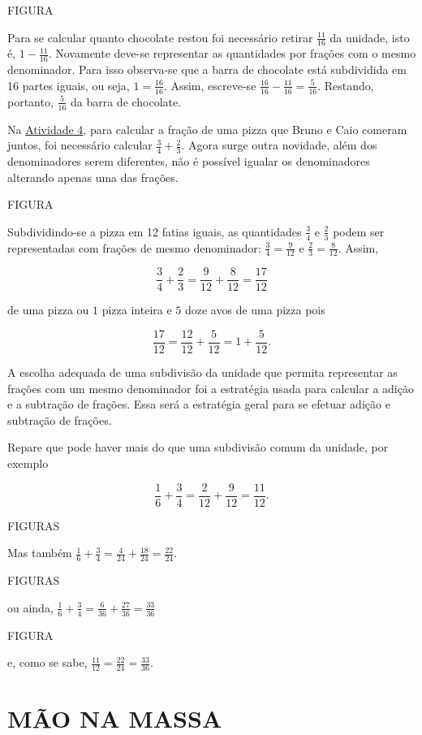FIGURA

Para se calcular quanto chocolate restou foi necessário retirar $\frac{11}{16}$ da unidade, isto é, $1 - \frac{11}{16}$. 
Novamente deve-se representar as quantidades por frações com o mesmo denominador. 
Para isso observa-se que a barra de chocolate está subdividida em 16 partes iguais, ou seja,  $1 = \frac{16}{16}$. Assim, escreve-se $\frac{16}{16} - \frac{11}{16} = \frac{5}{16}$. 
Restando, portanto, $\frac{5}{16}$ da barra de chocolate.

Na \hyperref[chap5-ativ4]{Atividade 4}, para calcular a fração de uma pizza que Bruno e Caio comeram juntos, foi necessário calcular $\frac{3}{4} + \frac{2}{3}$. 
Agora surge outra novidade, além dos denominadores serem diferentes, não é possível igualar os denominadores alterando apenas uma das frações.

FIGURA

Subdividindo-se  a pizza em 12 fatias iguais, as quantidades $\frac{3}{4}$ e $\frac{2}{3}$ podem ser representadas com frações de mesmo denominador: $\frac{3}{4} = \frac{9}{12}$ e $\frac{2}{3} = \frac{8}{12}$. Assim,

\[ \frac{3}{4} + \frac{2}{3} = \frac{9}{12} + \frac{8}{12} = \frac{17}{12}\]

de uma pizza ou $1$ pizza inteira e $5$ doze avos de uma pizza pois 

\[\frac{17}{12} = \frac{12}{12} + \frac{5}{12} = 1 + \frac{5}{12}.\]

A escolha adequada de uma subdivisão da unidade que permita representar as frações com um mesmo denominador foi a estratégia usada para calcular a adição e a subtração de frações. 
Essa será a estratégia geral para se efetuar adição e subtração de frações.

Repare que pode haver mais do que uma subdivisão comum da unidade, por exemplo

\[ \frac{1}{6} + \frac{3}{4}  = \frac{2}{12} + \frac{9}{12}  = \frac{11}{12}.\]

FIGURAS

Mas também $\frac{1}{6} + \frac{3}{4} = \frac{4}{24} + \frac{18}{24} = \frac{22}{24}$.

FIGURAS

ou ainda, $\frac{1}{6} + \frac{3}{4} = \frac{6}{36} + \frac{27}{36} = \frac{33}{36}$

FIGURA

e, como se sabe, $\frac{11}{12} = \frac{22}{24} = \frac{33}{36}$.


\section{MÃO NA MASSA }


